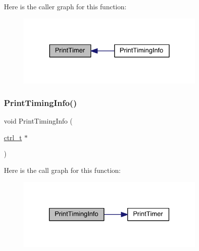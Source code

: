 Here is the caller graph for this function\+:\nopagebreak
\begin{figure}[H]
\begin{center}
\leavevmode
\includegraphics[width=264pt]{a00951_a8a9ea6599a196d0ef23ba44827e50028_icgraph}
\end{center}
\end{figure}
\mbox{\label{a00951_a3cddcf8352dd0855fe356eef9322b1cf}} 
\subsubsection{\texorpdfstring{Print\+Timing\+Info()}{PrintTimingInfo()}}
{\footnotesize\ttfamily void Print\+Timing\+Info (\begin{DoxyParamCaption}\item[{\hyperlink{a00742}{ctrl\+\_\+t} $\ast$}]{ }\end{DoxyParamCaption})}

Here is the call graph for this function\+:\nopagebreak
\begin{figure}[H]
\begin{center}
\leavevmode
\includegraphics[width=264pt]{a00951_a3cddcf8352dd0855fe356eef9322b1cf_cgraph}
\end{center}
\end{figure}
\mbox{\label{a00951_a1c5fce2e7f10e9cf7ee6d872b1fa0106}} 
